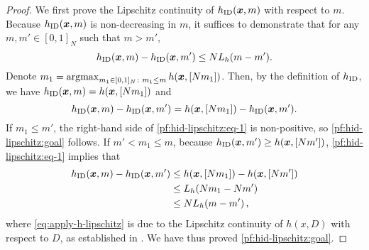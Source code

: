 \begin{proof}\label{proof:hID drift}
    We first prove the Lipschitz continuity of $h_{\textnormal{ID}}(\bm{x}, m)$ with respect to $m$. 
    Because $h_{\textnormal{ID}}(\bm{x}, m)$ is non-decreasing in $m$, it suffices to demonstrate that for any $m, m'\in[0,1]_N$ such that $m > m'$, 
    \begin{equation}
        \label{pf:hid-lipschitz:goal}
        h_{\textnormal{ID}}(\bm{x}, m) - h_{\textnormal{ID}}(\bm{x}, m') \leq NL_h (m-m').
    \end{equation}
    Denote $m_1=\operatorname*{argmax}_{m_1\in[0,1]_N\colon m_1\leq m}h(\bm{x},[Nm_1])$. Then, by the definition of $h_{\textnormal{ID}}$, we have $h_{\textnormal{ID}}(\bm{x},m)=h(\bm{x},[Nm_1])$ and 
    \begin{equation}
        \label{pf:hid-lipschitz:eq-1}
        h_{\textnormal{ID}}(\bm{x}, m) - h_{\textnormal{ID}}(\bm{x}, m') =  h(\bm{x}, [Nm_1]) - h_{\textnormal{ID}}(\bm{x}, m'). 
    \end{equation}
    If $m_1\leq m'$, the right-hand side of \eqref{pf:hid-lipschitz:eq-1} is non-positive, so \eqref{pf:hid-lipschitz:goal} follows. 
    If $m'< m_1 \leq m$, because $h_{\textnormal{ID}}(\bm{x}, m')\geq h(\bm{x}, [Nm'])$,  \eqref{pf:hid-lipschitz:eq-1} implies that
    \begin{align}
        \nonumber
        h_{\textnormal{ID}}(\bm{x},m)-h_{\textnormal{ID}}(\bm{x},m')
        &\leq h(\bm{x}, [Nm_1])  - h(\bm{x}, [Nm']) \\
        \label{eq:apply-h-lipschitz}
        &\leq L_h (Nm_1-Nm')\\
        \nonumber
        &\leq NL_h(m-m')\,,
    \end{align}
    where \eqref{eq:apply-h-lipschitz} is due to the Lipschitz continuity of $h(x, D)$ with respect to $D$, as established in . 
    We have thus proved \eqref{pf:hid-lipschitz:goal}. 


\end{proof}
